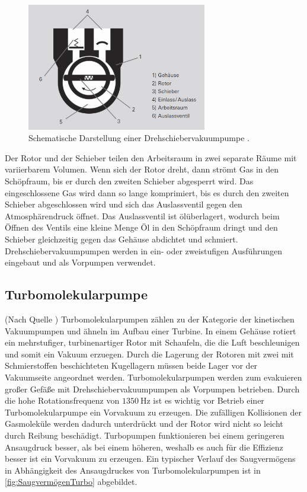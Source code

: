 \begin{figure}[H]
    \centering
    \includegraphics[width=0.7\textwidth]{data/drehschieberpumpe.png}
    \caption{Schematische Darstellung einer Drehschiebervakuumpumpe \cite{Drehschiebervakuumpumpen}.}
    \label{fig:drehschieberpumpe}
\end{figure}

\noindent
Der Rotor und der Schieber teilen den Arbeitsraum in zwei separate Räume mit variierbarem Volumen. Wenn sich der Rotor dreht, dann strömt Gas in den Schöpfraum, bis er durch den zweiten Schieber abgesperrt wird. Das eingeschlossene Gas wird dann so lange komprimiert, bis es durch den zweiten Schieber 
abgeschlossen wird und sich das Auslassventil gegen den Atmosphärendruck öffnet. Das Auslassventil ist ölüberlagert, wodurch beim Öffnen des Ventils eine kleine Menge Öl in den Schöpfraum dringt und den Schieber gleichzeitig gegen das Gehäuse abdichtet und schmiert.
Drehschiebervakuumpumpen werden in ein- oder zweistufigen Ausführungen eingebaut und als Vorpumpen verwendet.

\subsection{Turbomolekularpumpe}
\label{subsec:turbopumpe}

(Nach Quelle \cite{Turbomolekularpumpen}) Turbomolekularpumpen zählen zu der Kategorie der kinetischen Vakuumpumpen und ähneln im Aufbau einer Turbine. In einem Gehäuse rotiert ein mehrstufiger, turbinenartiger Rotor mit Schaufeln, die die Luft beschleunigen und somit ein Vakuum erzuegen. Durch die Lagerung der 
Rotoren mit zwei mit Schmierstoffen beschichteten Kugellagern müssen beide Lager vor der Vakuumseite angeordnet werden. Turbomolekularpumpen werden zum evakuieren großer Gefäße mit Drehschiebervakuumpumpen als Vorpumpen betrieben. Durch die hohe Rotationsfrequenz von $\SI{1350}{\hertz}$ ist es wichtig vor Betrieb einer Turbomolekularpumpe ein 
Vorvakuum zu erzeugen. Die zufälligen Kollisionen der Gasmoleküle werden dadurch unterdrückt und der Rotor wird nicht so leicht durch Reibung beschädigt. Turbopumpen funktionieren bei einem geringeren Ansaugdruck besser, als bei einem höheren, weshalb es auch für die Effizienz besser ist ein Vorvakuum zu erzeugen.
Ein typischer Verlauf des Saugvermögens in Abhängigkeit des Ansaugdruckes von Turbomolekularpumpen ist in \autoref{fig:SaugvermögenTurbo} abgebildet.
 
